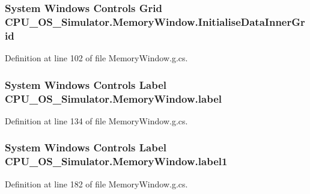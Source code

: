 \subsubsection[{Initialise\+Data\+Inner\+Grid}]{\setlength{\rightskip}{0pt plus 5cm}System Windows Controls Grid C\+P\+U\+\_\+\+O\+S\+\_\+\+Simulator.\+Memory\+Window.\+Initialise\+Data\+Inner\+Grid\hspace{0.3cm}{\ttfamily [package]}}\label{class_c_p_u___o_s___simulator_1_1_memory_window_a2f298db1546fe63bca79b0a810304381}


Definition at line 102 of file Memory\+Window.\+g.\+cs.

\hypertarget{class_c_p_u___o_s___simulator_1_1_memory_window_ad5fa08b25fc582e9b2f7c305ed12a960}{}
\subsubsection[{label}]{\setlength{\rightskip}{0pt plus 5cm}System Windows Controls Label C\+P\+U\+\_\+\+O\+S\+\_\+\+Simulator.\+Memory\+Window.\+label\hspace{0.3cm}{\ttfamily [package]}}\label{class_c_p_u___o_s___simulator_1_1_memory_window_ad5fa08b25fc582e9b2f7c305ed12a960}


Definition at line 134 of file Memory\+Window.\+g.\+cs.

\hypertarget{class_c_p_u___o_s___simulator_1_1_memory_window_ae35c7d3110d7cf96493d6fa68274e858}{}
\subsubsection[{label1}]{\setlength{\rightskip}{0pt plus 5cm}System Windows Controls Label C\+P\+U\+\_\+\+O\+S\+\_\+\+Simulator.\+Memory\+Window.\+label1\hspace{0.3cm}{\ttfamily [package]}}\label{class_c_p_u___o_s___simulator_1_1_memory_window_ae35c7d3110d7cf96493d6fa68274e858}


Definition at line 182 of file Memory\+Window.\+g.\+cs.

